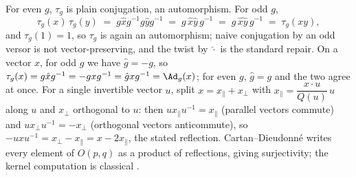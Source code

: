 For even $g$, $\tau_g$ is plain conjugation, an automorphism. For odd $g$,
\[
\tau_g(x)\,\tau_g(y) \;=\; g\hat{x}g^{-1}g\hat{y}g^{-1} \;=\; g\,\hat{x}\hat{y}\,g^{-1} \;=\; g\,\widehat{xy}\,g^{-1} \;=\; \tau_g(xy),
\]
and $\tau_g(1) = 1$, so $\tau_g$ is again an automorphism; naive conjugation by an odd versor is not vector-preserving, and the twist by $\hat{\cdot}$ is the standard repair. On a vector $x$, for odd $g$ we have $\hat{g} = -g$, so $\tau_g(x) = g\hat{x}g^{-1} = -gxg^{-1} = \hat{g}xg^{-1} = \Ad_g(x)$; for even $g$, $\hat{g} = g$ and the two agree at once. For a single invertible vector $u$, split $x = x_{\parallel} + x_{\perp}$ with $x_{\parallel} = \dfrac{x \cdot u}{Q(u)}\,u$ along $u$ and $x_{\perp}$ orthogonal to $u$: then $u x_{\parallel} u^{-1} = x_{\parallel}$ (parallel vectors commute) and $u x_{\perp} u^{-1} = -x_{\perp}$ (orthogonal vectors anticommute), so $-uxu^{-1} = x_{\perp} - x_{\parallel} = x - 2x_{\parallel}$, the stated reflection. Cartan--Dieudonn\'e \cite{Lam2005, Porteous1995} writes every element of $O(p,q)$ as a product of reflections, giving surjectivity; the kernel computation is classical \cite{Porteous1995}.
